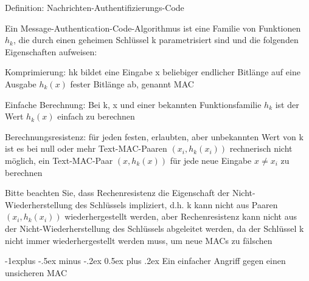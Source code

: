 \documentclass[a4paper]{article}
\makeatletter
\renewcommand{\subsection}{\@startsection{subsection}{2}{0mm}%
 {-1explus -.5ex minus -.2ex}%
 {0.5ex plus .2ex}%
 {\normalfont\normalsize\bfseries}}
\makeatother
\begin{document}
\begin{multicols}{3}
      \begin{itemize*}
            \item Definition: Nachrichten-Authentifizierungs-Code
            \begin{itemize*}
                  \item Ein Message-Authentication-Code-Algorithmus ist eine Familie von Funktionen $h_k$, die durch einen geheimen Schlüssel k parametrisiert sind und die folgenden Eigenschaften aufweisen:
                  \begin{itemize*} \item Komprimierung: hk bildet eine Eingabe x beliebiger endlicher Bitlänge auf eine Ausgabe $h_k(x)$ fester Bitlänge ab, genannt MAC \item Einfache Berechnung: Bei k, x und einer bekannten Funktionsfamilie $h_k$ ist der Wert $h_k(x)$ einfach zu berechnen \item Berechnungsresistenz: für jeden festen, erlaubten, aber unbekannten Wert von k ist es bei null oder mehr Text-MAC-Paaren $(x_i, h_k(x_i))$ rechnerisch nicht möglich, ein Text-MAC-Paar $(x, h_k(x))$ für jede neue Eingabe $x\not= x_i$ zu berechnen \end{itemize*}
                  \item Bitte beachten Sie, dass Rechenresistenz die Eigenschaft der Nicht-Wiederherstellung des Schlüssels impliziert, d.h. k kann nicht aus Paaren $(x_i,h_k(x_i))$ wiederhergestellt werden, aber Rechenresistenz kann nicht aus der Nicht-Wiederherstellung des Schlüssels abgeleitet werden, da der Schlüssel k nicht immer wiederhergestellt werden muss, um neue MACs zu fälschen
            \end{itemize*}
      \end{itemize*}


      \subsection{Ein einfacher Angriff gegen einen unsicheren
            MAC}


\end{multicols}
\end{document}
